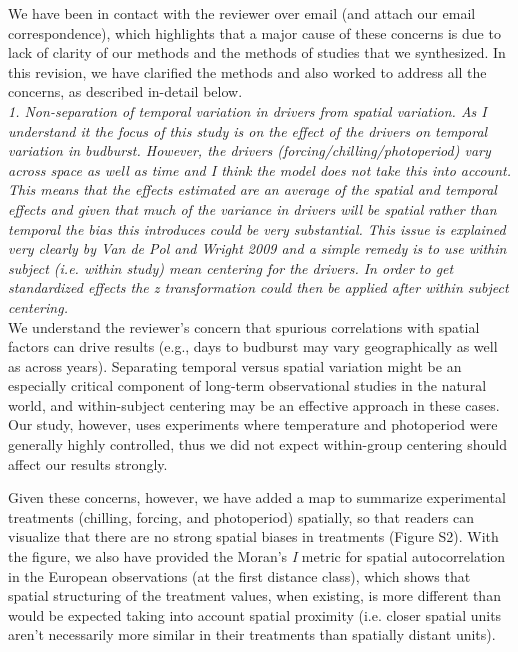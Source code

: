 \documentclass{article}
\begin{document}
We have been in contact with the reviewer over email (and attach our email correspondence), which highlights that a major cause of these concerns is due to lack of clarity of our methods and the methods of studies that we synthesized. In this revision, we have clarified the methods and also worked to address all the concerns, as described in-detail below.\\

\emph{1. Non-separation of temporal variation in drivers from spatial variation. As I understand it the
focus of this study is on the effect of the drivers on temporal variation in budburst. However,
the drivers (forcing/chilling/photoperiod) vary across space as well as time and I think the
model does not take this into account. This means that the effects estimated are an average of
the spatial and temporal effects and given that much of the variance in drivers will be spatial
rather than temporal the bias this introduces could be very substantial. This issue is explained
very clearly by Van de Pol and Wright 2009 and a simple remedy is to use within subject (i.e.
within study) mean centering for the drivers. In order to get standardized effects the z
transformation could then be applied after within subject centering.}\\

We understand the reviewer's concern that spurious correlations with spatial factors can drive results (e.g., days to budburst may vary geographically as well as across years). Separating temporal versus spatial variation might be an especially critical component of long-term observational studies in the natural world, and within-subject centering may be an effective approach in these cases. Our study, however, uses experiments where temperature and photoperiod were generally highly controlled, thus we did not expect within-group centering should affect our results strongly. 

Given these concerns, however, we have added a map to summarize experimental treatments (chilling, forcing, and photoperiod) spatially, so that readers can visualize that there are no strong spatial biases in treatments (Figure S2). With the figure, we also have provided the Moran's \emph{I} metric for spatial autocorrelation in the European observations (at the first distance class), which shows that spatial structuring of the treatment values, when existing, is more different than would be expected taking into account spatial proximity (i.e. closer spatial units aren't necessarily more similar in their treatments than spatially distant units). 
\end{document}
